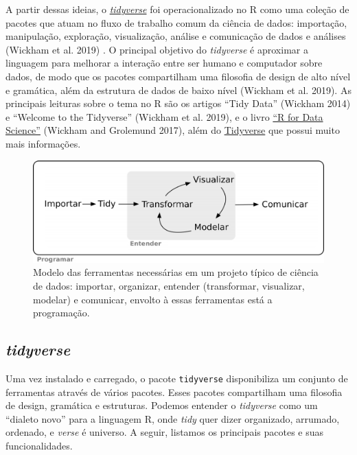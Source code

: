 \documentclass[
]{article}
\begin{document}
A partir dessas ideias, o \href{https://www.tidyverse.org/}{\emph{tidyverse}} foi operacionalizado no R como uma coleção de pacotes que atuam no fluxo de trabalho comum da ciência de dados: importação, manipulação, exploração, visualização, análise e comunicação de dados e análises (Wickham et al. 2019) . O principal objetivo do \emph{tidyverse} é aproximar a linguagem para melhorar a interação entre ser humano e computador sobre dados, de modo que os pacotes compartilham uma filosofia de design de alto nível e gramática, além da estrutura de dados de baixo nível (Wickham et al. 2019). As principais leituras sobre o tema no R são os artigos ``Tidy Data'' (Wickham 2014) e ``Welcome to the Tidyverse'' (Wickham et al. 2019), e o livro \href{https://r4ds.had.co.nz/}{``R for Data Science''} (Wickham and Grolemund 2017), além do \href{https://www.tidyverse.org/}{Tidyverse} que possui muito mais informações.

\begin{figure}

{\centering \includegraphics[width=0.75\linewidth,height=0.75\textheight]{figures/cap05_fig01} 

}

\caption{Modelo das ferramentas necessárias em um projeto típico de ciência de dados: importar, organizar, entender (transformar, visualizar, modelar) e comunicar, envolto à essas ferramentas está a programação.}\label{fig:fig-r-tidyverse}
\end{figure}

\hypertarget{tidyverse}{%
\subsection{\texorpdfstring{\emph{tidyverse}}{tidyverse}}\label{tidyverse}}

Uma vez instalado e carregado, o pacote \texttt{tidyverse} disponibiliza um conjunto de ferramentas através de vários pacotes. Esses pacotes compartilham uma filosofia de design, gramática e estruturas. Podemos entender o \emph{tidyverse} como um ``dialeto novo'' para a linguagem R, onde \emph{tidy} quer dizer organizado, arrumado, ordenado, e \emph{verse} é universo. A seguir, listamos os principais pacotes e suas funcionalidades.
\end{document}
